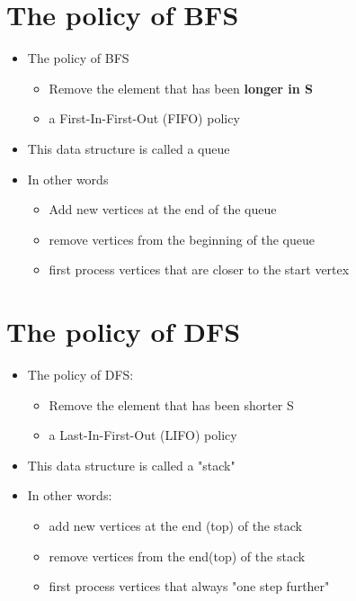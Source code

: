\documentclass{article}[18pt]
\begin{document}
\section{The policy of BFS}
\begin{itemize}
	\item The policy of BFS
	\begin{itemize}
		\item Remove the element that has been \textbf{longer in S}
		\item a First-In-First-Out (FIFO) policy
	\end{itemize}
	\item This data structure is called a queue
	\item In other words
	\begin{itemize}
		\item Add new vertices at the end of the queue
		\item remove vertices from the beginning of the queue
		\item first process vertices that are closer to the start vertex
	\end{itemize}
\end{itemize}
\section{The policy of DFS}
\begin{itemize}
	\item The policy of DFS:
	\begin{itemize}
		\item Remove the element that has been shorter S
		\item a Last-In-First-Out (LIFO) policy
	\end{itemize}
	\item This data structure is called a "stack"
	\item In other words:
	\begin{itemize}
		\item add new vertices at the end (top) of the stack
		\item remove vertices from the end(top) of the stack
		\item first process vertices that always "one step further"
	\end{itemize}
\end{itemize}
\end{document}
